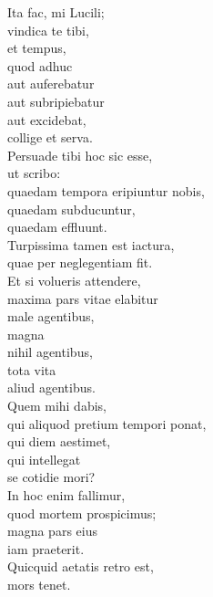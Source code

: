 {\large
\noindent Ita fac, mi Lucili; \\
vindica te tibi, \\
et tempus, \\
\tabto{2em} quod adhuc \\
\tabto{3em} aut auferebatur \\
\tabto{3em} aut subripiebatur \\
\tabto{3em} aut excidebat, \\
collige et serva.\\

\noindent Persuade tibi hoc sic esse, \\
\tabto{2em} ut scribo: \\
quaedam tempora eripiuntur nobis, \\
quaedam subducuntur, \\
quaedam effluunt. \\

\noindent Turpissima tamen est iactura, \\
\tabto{2em} quae per neglegentiam fit. \\

\noindent Et si volueris attendere, \\
\tabto{2em} maxima pars vitae elabitur \\
\tabto{3em} male agentibus, \\
\tabto{2em} magna \\
\tabto{3em} nihil agentibus, \\
\tabto{2em} tota vita \\
\tabto{3em} aliud agentibus.\\

\noindent Quem mihi dabis, \\
\tabto{2em} qui aliquod pretium tempori ponat, \\
\tabto{2em} qui diem aestimet, \\
\tabto{2em} qui intellegat \\
\tabto{3em} se cotidie mori? \\

\noindent In hoc enim fallimur, \\
\tabto{2em} quod mortem prospicimus; \\
magna pars eius \\
\tabto{2em} iam praeterit. \\

\noindent Quicquid aetatis retro est, \\
mors tenet.\\

}
